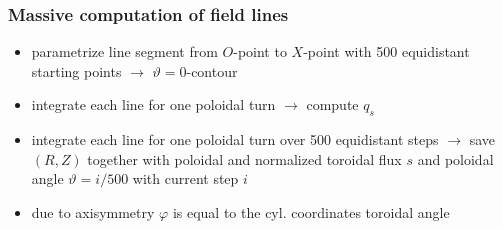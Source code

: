 \documentclass{beamer}
\begin{document}
\begin{frame}
\frametitle{Massive computation of field lines}
\vspace{0 cm}
		\vspace{-0.5 cm}
		\begin{center}
			\begin{itemize}
				\item parametrize line segment from $O$-point to $X$-point with 500 equidistant starting points $\rightarrow$ $\vartheta=0$-contour
				\item integrate each line for one poloidal turn $\rightarrow$ compute $q_s$
				\item integrate each line for one poloidal turn over 500 equidistant steps $\rightarrow$ save $(R,Z)$ together with poloidal and normalized toroidal flux $s$ and poloidal angle $\vartheta = i/500$ with current step $i$
				\item due to axisymmetry $\varphi$ is equal to the cyl. coordinates toroidal angle
			\end{itemize}
		\end{center}
\end{frame}
\end{document}
